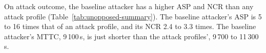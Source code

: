 \documentclass{cshonours}
\newcommand{\prelim}[1]{#1}
\begin{document}
On attack outcome, the baseline attacker has a higher ASP and NCR than any
attack profile (Table~\ref{tab:unopposed-summary}). The baseline attacker's
ASP is \prelim{5} to \prelim{16} times that of an attack profile, and its NCR
\prelim{2.4} to \prelim{3.3} times. The baseline attacker's MTTC,
\prelim{9\,100}\,s, is just shorter than the attack profiles',
\prelim{9\,700} to \prelim{11\,300}\,s.
\end{document}
